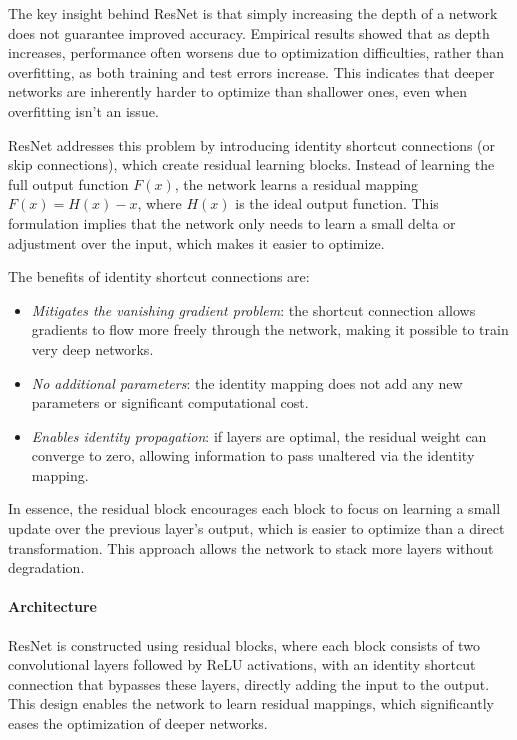The key insight behind ResNet is that simply increasing the depth of a network does not guarantee improved accuracy. 
Empirical results showed that as depth increases, performance often worsens due to optimization difficulties, rather than overfitting, as both training and test errors increase. 
This indicates that deeper networks are inherently harder to optimize than shallower ones, even when overfitting isn't an issue.

ResNet addresses this problem by introducing identity shortcut connections (or skip connections), which create residual learning blocks. 
Instead of learning the full output function $F(x)$, the network learns a residual mapping $F(x)=H(x)-x$, where $H(x)$ is the ideal output function. 
This formulation implies that the network only needs to learn a small delta or adjustment over the input, which makes it easier to optimize.

The benefits of identity shortcut connections are:
\begin{itemize}
    \item \textit{Mitigates the vanishing gradient problem}: the shortcut connection allows gradients to flow more freely through the network, making it possible to train very deep networks.
    \item \textit{No additional parameters}: the identity mapping does not add any new parameters or significant computational cost.
    \item \textit{Enables identity propagation}: if layers are optimal, the residual weight can converge to zero, allowing information to pass unaltered via the identity mapping.
\end{itemize}
In essence, the residual block encourages each block to focus on learning a small update over the previous layer's output, which is easier to optimize than a direct transformation. 
This approach allows the network to stack more layers without degradation.

\paragraph*{Architecture}
ResNet is constructed using residual blocks, where each block consists of two convolutional layers followed by ReLU activations, with an identity shortcut connection that bypasses these layers, directly adding the input to the output. 
This design enables the network to learn residual mappings, which significantly eases the optimization of deeper networks.

